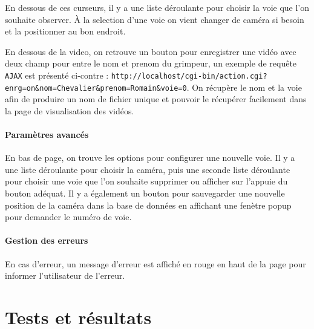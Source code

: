 \documentclass[a4paper, 11pt, french]{article}
\begin{document}
En dessous de ces curseurs, il y a une liste déroulante pour choisir la voie que l'on souhaite observer. À la selection d'une voie on vient changer de caméra si besoin et la positionner au bon endroit.

En dessous de la video, on retrouve un bouton pour enregistrer une vidéo avec deux champ pour entre le nom et prenom du grimpeur, un exemple de requête \texttt{AJAX} est présenté ci-contre : \texttt{http://localhost/cgi-bin/action.cgi?enrg=on\&nom=Chevalier\&prenom=Romain\&voie=0}. On récupère le nom et la voie afin de produire un nom de fichier unique et pouvoir le récupérer facilement dans la page de visualisation des vidéos.

\paragraph{Paramètres avancés}  En bas de page, on trouve les options pour configurer une nouvelle voie. Il y a une liste déroulante pour choisir la caméra, puis une seconde liste déroulante pour choisir une voie que l'on souhaite supprimer ou afficher sur l'appuie du bouton adéquat. Il y a également un bouton pour sauvegarder une nouvelle position de la caméra dans la base de données en affichant une fenètre popup pour demander le numéro de voie. 

\paragraph{Gestion des erreurs} En cas d'erreur, un message d'erreur est affiché en rouge en haut de la page pour informer l'utilisateur de l'erreur.


















\section{Tests et résultats}
\end{document}
